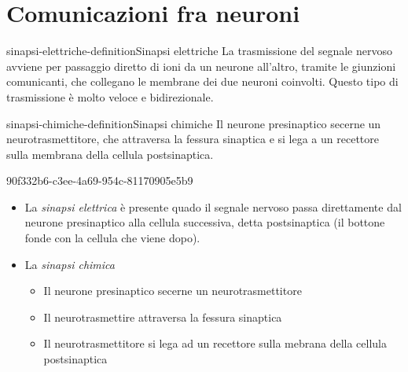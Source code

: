 \documentclass[preview]{standalone}
\begin{document}

\section{Comunicazioni fra neuroni}

\begin{snippetdefinition}{sinapsi-elettriche-definition}{Sinapsi elettriche}
    La trasmissione del segnale nervoso avviene per passaggio diretto di ioni da un neurone
    all'altro, tramite le giunzioni comunicanti, che collegano le membrane dei due neuroni
    coinvolti. Questo tipo di trasmissione è molto veloce e bidirezionale.
\end{snippetdefinition}

\begin{snippetdefinition}{sinapsi-chimiche-definition}{Sinapsi chimiche}
    Il neurone presinaptico secerne un neurotrasmettitore, che attraversa la fessura sinaptica
    e si lega a un recettore sulla membrana della cellula postsinaptica.
\end{snippetdefinition}

\begin{snippet}{90f332b6-c3ee-4a69-954c-81170905e5b9}
    \begin{itemize}
        \item  La \textit{sinapsi elettrica} è presente quado il segnale nervoso passa direttamente dal
        neurone presinaptico alla cellula successiva, detta postsinaptica (il bottone fonde con la cellula che viene dopo).
        \item La \textit{sinapsi chimica}
        \begin{itemize}
            \item Il neurone presinaptico secerne un neurotrasmettitore
            \item Il neurotrasmettire attraversa la fessura sinaptica
            \item Il neurotrasmettitore si lega ad un recettore sulla mebrana della cellula postsinaptica
        \end{itemize}
    \end{itemize}
\end{snippet}

\end{document}
